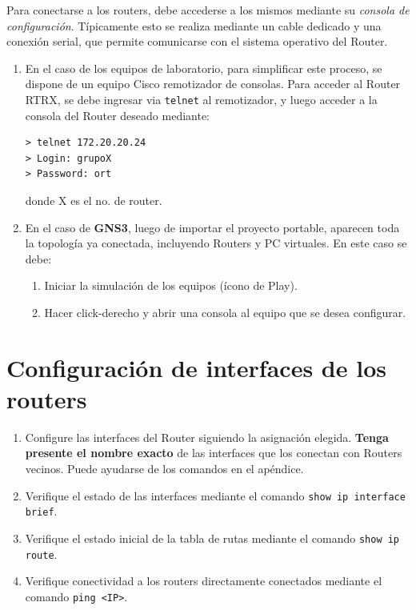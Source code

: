 \documentclass[a4paper,10pt]{article}
\begin{document}
Para conectarse a los routers, debe accederse a los mismos mediante su \emph{consola de configuración}. Típicamente esto se realiza mediante un cable dedicado y una conexión serial, que permite comunicarse con el sistema operativo del Router.

\begin{enumerate}[label={\bf \alph*)}]
\item En el caso de los equipos de laboratorio, para simplificar este proceso, se dispone de un equipo Cisco remotizador de consolas. Para acceder al Router RTRX, se debe ingresar via \texttt{telnet} al remotizador, y luego acceder a la consola del Router deseado mediante:
\begin{verbatim}
> telnet 172.20.20.24
> Login: grupoX
> Password: ort
\end{verbatim}
donde X es el no. de router.

\item En el caso de \textbf{GNS3}, luego de importar el proyecto portable, aparecen toda la topología ya conectada, incluyendo Routers y PC virtuales. En este caso se debe:
 \begin{enumerate}[label=\arabic*.]
    \item Iniciar la simulación de los equipos (ícono de Play).
    \item Hacer click-derecho y abrir una consola al equipo que se desea configurar.
 \end{enumerate}
\end{enumerate}

\section{Configuración de interfaces de los routers}

\begin{enumerate}
    \item Configure las interfaces del Router siguiendo la asignación elegida. \textbf{Tenga presente el nombre exacto} de las interfaces que los conectan con Routers vecinos. Puede ayudarse de los comandos en el apéndice.
    \item Verifique el estado de las interfaces mediante el comando \texttt{show ip interface brief}.
    \item Verifique el estado inicial de la tabla de rutas mediante el comando \texttt{show ip route}.
    \item Verifique conectividad a los routers directamente conectados mediante el comando \texttt{ping <IP>}.
\end{enumerate}
\end{document}
